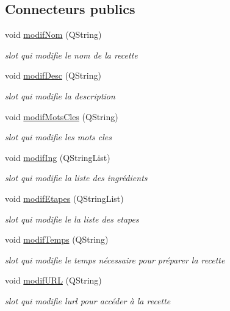 \subsection*{Connecteurs publics}
\begin{DoxyCompactItemize}
\item 
void \hyperlink{classMainWindow_ac154b320efe8998a85a93f1c41ace7e4}{modif\+Nom} (Q\+String)
\begin{DoxyCompactList}\small\item\em slot qui modifie le nom de la recette \end{DoxyCompactList}\item 
void \hyperlink{classMainWindow_a77ada7a541d869ea7f3647900ba6f6df}{modif\+Desc} (Q\+String)
\begin{DoxyCompactList}\small\item\em slot qui modifie la description \end{DoxyCompactList}\item 
void \hyperlink{classMainWindow_ae9b5aeb3f3b89a40008486d1329a68bc}{modif\+Mots\+Cles} (Q\+String)
\begin{DoxyCompactList}\small\item\em slot qui modifie les mots cles \end{DoxyCompactList}\item 
void \hyperlink{classMainWindow_a64a5116401b4a54c55c6a7d34fc7ec93}{modif\+Ing} (Q\+String\+List)
\begin{DoxyCompactList}\small\item\em slot qui modifie la liste des ingrédients \end{DoxyCompactList}\item 
void \hyperlink{classMainWindow_a1a85241ab332ebb026638ff0a6df83e0}{modif\+Etapes} (Q\+String\+List)
\begin{DoxyCompactList}\small\item\em slot qui modifie le la liste des etapes \end{DoxyCompactList}\item 
void \hyperlink{classMainWindow_ab49cf9603a1a539ca19623eac88b86c2}{modif\+Temps} (Q\+String)
\begin{DoxyCompactList}\small\item\em slot qui modifie le temps nécessaire pour préparer la recette \end{DoxyCompactList}\item 
void \hyperlink{classMainWindow_a3620273f0e53b380d70df636400e8519}{modif\+U\+RL} (Q\+String)
\begin{DoxyCompactList}\small\item\em slot qui modifie l\textquotesingle{}url pour accéder à la recette \end{DoxyCompactList}\end{DoxyCompactItemize}
